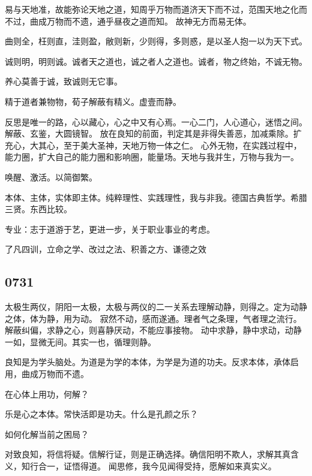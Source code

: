 易与天地准，故能弥论天地之道，知周乎万物而道济天下而不过，范围天地之化而不过，曲成万物而不遗，通乎昼夜之道而知。
故神无方而易无体。

曲则全，枉则直，洼则盈，敝则新，少则得，多则惑，是以圣人抱一以为天下式。

诚则明，明则诚。诚者天之道也，诚之者人之道也。诚者，物之终始，不诚无物。

养心莫善于诚，致诚则无它事。

精于道者兼物物，荀子解蔽有精义。虚壹而静。

反思是唯一的路，心以藏心，心之中又有心焉。一心二门，人心道心，迷悟之间。解蔽、玄鉴，大圆镜智。
放在良知的前面，判定其是非得失善恶，加减乘除。扩充心，大其心，至于美大圣神，天地万物一体之仁。
心外无物，在实践过程中，能力圈，扩大自己的能力圈和影响圈，能量场。天地与我并生，万物与我为一。

唤醒、激活。以简御繁。

本体、主体，实体即主体。纯粹理性、实践理性，我与非我。德国古典哲学。希腊三贤。东西比较。

专业：志于道游于艺，更进一步，关于职业事业的考虑。

了凡四训，立命之学、改过之法、积善之方、谦德之效

\subsection{0731}

太极生两仪，阴阳一太极，太极与两仪的二一关系去理解动静，则得之。定为动静之体，体为静，用为动。
寂然不动，感而遂通。理者气之条理，气者理之流行。解蔽纠偏，求静之心，则喜静厌动，不能应事接物。
动中求静，静中求动，动静一如，显微无间。其实一也，循理则静。

良知是为学头脑处。为道是为学的本体，为学是为道的功夫。反求本体，承体启用，曲成万物而不遗。

在心体上用功，何解？

乐是心之本体。常快活即是功夫。什么是孔颜之乐？

如何化解当前之困局？

对致良知，将信将疑。信解行证，则是正确选择。确信阳明不欺人，求解其真含义，知行合一，证悟得道。
闻思修，我今见闻得受持，愿解如来真实义。
